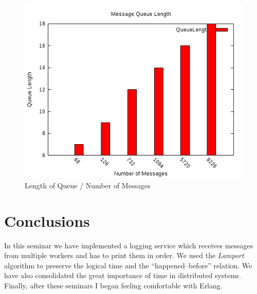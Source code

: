 \documentclass[a4paper, 11pt]{article}
\begin{document}
\begin{figure}[h!]
\begin{center}
    \includegraphics[scale=0.6]{queue_length.jpg}
    \caption{Length of Queue / Number of Messages}
    \label{fig:metrics}
\end{center}
\end{figure}

\section{Conclusions}

In this seminar we have implemented a logging service which receives messages
from multiple workers and has to print them in order. We used the \emph{Lamport}
algorithm to preserve the logical time and the ``happened--before'' relation. We
have also consolidated the great importance of time in distributed systems.
Finally, after these seminars I began feeling comfortable with Erlang.
\end{document}
